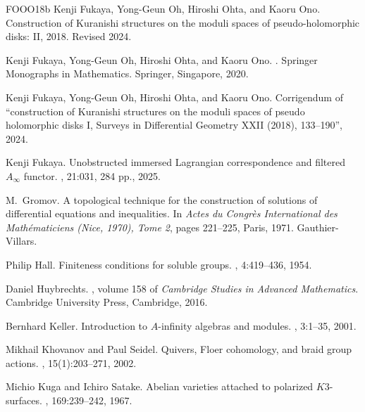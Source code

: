 \documentclass[11pt]{article}
\numberwithin{equation}{section}
\theoremstyle{definition}
\theoremstyle{remark}
\begin{document}
\begin{thebibliography}{FOOO18b}
Kenji Fukaya, Yong-Geun Oh, Hiroshi Ohta, and Kaoru Ono.
\newblock Construction of {Kuranishi} structures on the moduli spaces of
  pseudo-holomorphic disks: {II}, 2018.
\newblock Revised 2024.

Kenji Fukaya, Yong-Geun Oh, Hiroshi Ohta, and Kaoru Ono.
.
\newblock Springer Monographs in Mathematics. Springer, Singapore, 2020.

Kenji Fukaya, Yong-Geun Oh, Hiroshi Ohta, and Kaoru Ono.
\newblock Corrigendum of ``construction of {Kuranishi} structures on the moduli
  spaces of pseudo holomorphic disks {I}, {Surveys in Differential Geometry
  XXII} (2018), 133--190'', 2024.

Kenji Fukaya.
\newblock Unobstructed immersed {Lagrangian} correspondence and filtered
  {$A_\infty$} functor.
,
  21:031, 284 pp., 2025.

M.~Gromov.
\newblock A topological technique for the construction of solutions of
  differential equations and inequalities.
\newblock In {\em Actes du Congr{\`e}s International des Math{\'e}maticiens
  (Nice, 1970), Tome 2}, pages 221--225, Paris, 1971. Gauthier-Villars.

Philip Hall.
\newblock Finiteness conditions for soluble groups.
, 4:419--436,
  1954.

Daniel Huybrechts.
, volume 158 of {\em Cambridge
  Studies in Advanced Mathematics}.
\newblock Cambridge University Press, Cambridge, 2016.

Bernhard Keller.
\newblock Introduction to {$A$}-infinity algebras and modules.
, 3:1--35, 2001.

Mikhail Khovanov and Paul Seidel.
\newblock Quivers, {Floer} cohomology, and braid group actions.
, 15(1):203--271,
  2002.

Michio Kuga and Ichiro Satake.
\newblock Abelian varieties attached to polarized {$K3$}-surfaces.
, 169:239--242, 1967.


\end{thebibliography}
\end{document}
